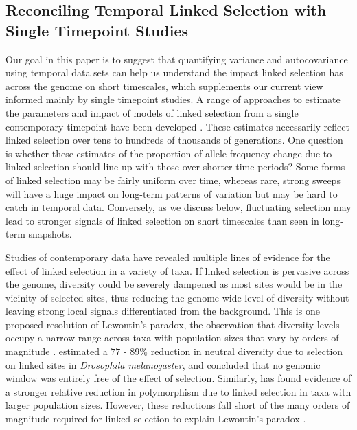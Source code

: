 \documentclass[11pt]{article}
\begin{document}
\subsection{Reconciling Temporal Linked Selection with Single Timepoint Studies}

Our goal in this paper is to suggest that quantifying variance and
autocovariance using temporal data sets can help us understand the impact
linked selection has across the genome on short timescales, which supplements
our current view informed mainly by single timepoint studies. A range of
approaches to estimate the parameters and impact of models of linked selection
from a single contemporary timepoint have been developed
\parencite{Wiehe1993-ja,Begun1992-ey,Sella2009-rf,Elyashiv2016-vt,McVicker2009-ax,Hudson1994-yq}.
These estimates necessarily reflect linked selection over tens to hundreds of
thousands of generations. One question is whether these estimates of the
proportion of allele frequency change due to linked selection should line up
with those over shorter time periods? Some forms of linked selection may be
fairly uniform over time, whereas rare, strong sweeps will have a huge impact
on long-term patterns of variation but may be hard to catch in temporal data.
Conversely, as we discuss below, fluctuating selection may lead to stronger
signals of linked selection on short timescales than seen in long-term
snapshots.

Studies of contemporary data have revealed multiple lines of evidence for the
effect of linked selection in a variety of taxa. If linked selection is
pervasive across the genome, diversity could be severely dampened as most sites
would be in the vicinity of selected sites, thus reducing the genome-wide level
of diversity without leaving strong local signals differentiated from the
background. This is one proposed resolution of Lewontin's paradox, the
observation that diversity levels occupy a narrow range across taxa with
population sizes that vary by orders of magnitude
\parencite{Lewontin1974-jb,Maynard_Smith1974-lc,Gillespie2001-ll,Leffler2012-zj}.
\textcite{Elyashiv2016-vt} estimated a $77$ - $89\%$ reduction in neutral
diversity due to selection on linked sites in \emph{Drosophila melanogaster},
and concluded that no genomic window was entirely free of the effect of
selection. Similarly, \textcite{Corbett-Detig2015-gt} has found evidence of a
stronger relative reduction in polymorphism due to linked selection in taxa
with larger population sizes. However, these reductions fall short of the many
orders of magnitude required for linked selection to explain Lewontin's paradox
\parencite{Coop2016-gx}.   
\end{document}
